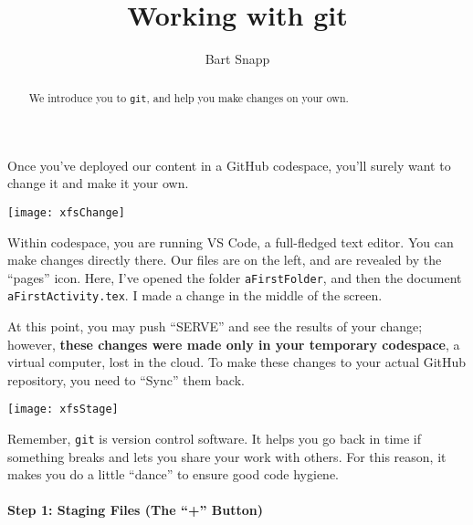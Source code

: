 \documentclass{ximera}
\author{Bart Snapp}
\title{Working with git}
\begin{document}
\pdfOnly{\onecolumn}
\begin{abstract}
    We introduce you to \texttt{git}, and help you make changes on your own.
\end{abstract}
\maketitle
Once you've deployed our content in a GitHub codespace, you'll surely want to
change it and  make it your own.
\begin{image}
    \texttt{[image: xfsChange]}
\end{image}
    Within codespace, you are running VS Code, a
    full-fledged text editor. You can make changes directly there. Our files
    are on
    the left, and are revealed by the ``pages'' icon.
    Here, I've opened the folder \verb!aFirstFolder!, and then the document
    \verb!aFirstActivity.tex!. I made a change in the middle of the screen.

    At this point, you may push ``SERVE'' and see the results of your change;
    however, \textbf{these changes were made only in your temporary codespace},
    a
    virtual
    computer, lost in the cloud. To make these changes to your actual GitHub
    repository, you need to ``Sync'' them back.
\pdfOnly{\end{multicols}}

\newpage

\begin{image}
    \texttt{[image: xfsStage]}
\end{image}

    Remember, \verb!git! is version control software.  It helps you go back in time if something breaks and lets you
    share
    your work with others. For this reason, it makes you do a little ``dance''
    to ensure good code hygiene.

    \paragraph{Step 1: Staging Files (The ``+'' Button)}
\end{document}
